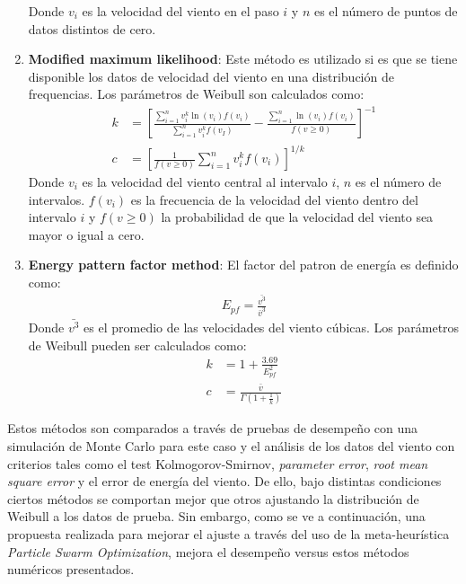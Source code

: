 \begin{enumerate}
         Donde $v_i$ es la velocidad del viento en el paso $i$ y $n$ es el número de puntos de datos distintos de cero. 
    \item \textbf{Modified maximum likelihood}: Este método es utilizado si es que se tiene disponible los datos de velocidad del viento en una distribución de frequencias. Los parámetros de Weibull son calculados como:
        \begin{align}
            k &= [\frac{\sum_{i=1}^n v_i^k \ln(v_i)f(v_i)}{\sum_{i=1}^n v_i^kf(v_I)} - \frac{\sum_{i=1}^n\ln(v_i)f(v_i)}{f(v \geq 0)}]^{-1}\\
            c &= [\frac{1}{f(v \geq 0)}\sum_{i=1}^n v_i^{k}f(v_i)]^{1/k}
        \end{align}
         Donde $v_i$ es la velocidad del viento central al intervalo $i$, $n$ es el número de intervalos. $f(v_i)$ es la frecuencia de la velocidad del viento dentro del intervalo $i$ y $f(v \geq 0)$ la probabilidad de que la velocidad del viento sea mayor o igual a cero.
    \item \textbf{Energy pattern factor method}: El factor del patron de energía es definido como:
        \begin{align}
            E_{pf} = \frac{\bar{v^3}}{\bar{v}^3}
        \end{align}   
         Donde $\bar{v^3}$ es el promedio de las velocidades del viento cúbicas. Los parámetros de Weibull pueden ser calculados como:
        \begin{align}
            k &= 1 + \frac{3.69}{E_{pf}^2}\\
            c &= \frac{\bar{v}}{\Gamma(1 + \frac{1}{k})}
        \end{align}    
 \end{enumerate}     
 Estos métodos son comparados a través de pruebas de desempeño con una simulación de Monte Carlo para este caso y el análisis de los datos del viento con criterios tales como el test Kolmogorov-Smirnov, \emph{parameter error}, \emph{root mean square error} y el error de energía del viento. De ello, bajo distintas condiciones ciertos métodos se comportan mejor que otros ajustando la distribución de Weibull a los datos de prueba. Sin embargo, como se ve a continuación, una propuesta realizada para mejorar el ajuste a través del uso de la meta-heurística \emph{Particle Swarm Optimization}, mejora el desempeño versus estos métodos numéricos presentados.  
